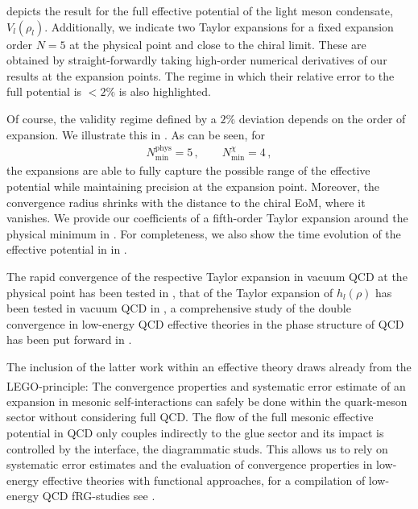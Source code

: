 \documentclass[aps,twocolumn,prd,superscriptaddress]{revtex4-2}
\newcommand{\LEGO}{LEGO\textsuperscript{\textregistered}}
\begin{document}
 depicts the result for the full effective potential of the light meson condensate, $V_l(\rho_l)$. Additionally, we indicate two Taylor expansions for a fixed expansion order $N=5$ at the physical point and close to the chiral limit. These are obtained by straight-forwardly taking high-order numerical derivatives of our results at the expansion points. The regime in which their relative error to the full potential is $<2\%$ is also highlighted.

Of course, the validity regime defined by a $2\%$ deviation depends on the order of expansion. We illustrate this in . As can be seen, for 
%
\begin{align}
	N_\textrm{min}^\textrm{phys} = 5\,,\qquad N_\textrm{min}^\chi= 4\,, 
\end{align}
%
the expansions are able to fully capture the possible range of the effective potential while maintaining precision at the expansion point. Moreover, the convergence radius shrinks with the distance to the chiral EoM, where it vanishes. We provide our coefficients of a fifth-order Taylor expansion around the physical minimum in . For completeness, we also show the time evolution of the effective potential in  in .

The rapid convergence of the respective Taylor expansion in vacuum QCD at the physical point has been tested in \cite{Mitter:2014wpa, Braun:2014ata, Rennecke:2015eba, Cyrol:2017ewj, Fu:2019hdw}, that of the Taylor expansion of $h_l(\rho)$ has been tested in vacuum QCD in \cite{Mitter:2014wpa, Braun:2014ata, Rennecke:2015eba, Cyrol:2017ewj}, a comprehensive study of the double convergence in low-energy QCD effective theories in the phase structure of QCD has been put forward in \cite{Pawlowski:2014zaa}. 

The inclusion of the latter work within an effective theory draws already from the \LEGO-principle: The convergence properties and systematic error estimate of an expansion in mesonic self-interactions can safely be done within the quark-meson sector without considering full QCD. The flow of the full mesonic effective potential in QCD only couples indirectly to the glue sector and its impact is controlled by the interface, the diagrammatic studs. This allows us to rely on systematic error estimates and the evaluation of convergence properties in low-energy effective theories with functional approaches, for a compilation of low-energy QCD fRG-studies see \cite{Dupuis:2020fhh}.
\end{document}
